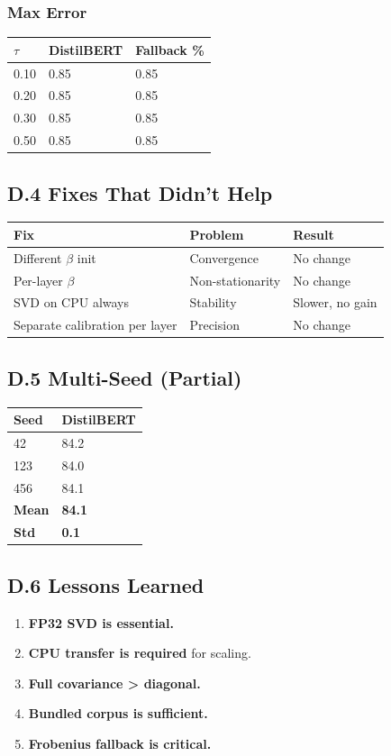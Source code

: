 \subsubsection{Max Error}

\begin{table}[H]
\centering
\small
\begin{tabular}{lll}
\toprule
\textbf{$\tau$} & \textbf{DistilBERT} & \textbf{Fallback \%} \\
\midrule
0.10 & 0.85 & 0.85 \\
0.20 & 0.85 & 0.85 \\
0.30 & 0.85 & 0.85 \\
0.50 & 0.85 & 0.85 \\
\bottomrule
\end{tabular}
\end{table}

\subsection{D.4 Fixes That Didn't Help}

\begin{table}[H]
\centering
\small
\begin{tabular}{lll}
\toprule
\textbf{Fix} & \textbf{Problem} & \textbf{Result} \\
\midrule
Different $\beta$ init & Convergence & No change \\
Per-layer $\beta$ & Non-stationarity & No change \\
SVD on CPU always & Stability & Slower, no gain \\
Separate calibration per layer & Precision & No change \\
\bottomrule
\end{tabular}
\end{table}

\subsection{D.5 Multi-Seed (Partial)}

\begin{table}[H]
\centering
\small
\begin{tabular}{ll}
\toprule
\textbf{Seed} & \textbf{DistilBERT} \\
\midrule
42 & 84.2 \\
123 & 84.0 \\
456 & 84.1 \\
\textbf{Mean} & \textbf{84.1} \\
\textbf{Std} & \textbf{0.1} \\
\bottomrule
\end{tabular}
\end{table}

\subsection{D.6 Lessons Learned}

\begin{enumerate}
\item \textbf{FP32 SVD is essential.}
\item \textbf{CPU transfer is required} for scaling.
\item \textbf{Full covariance > diagonal.}
\item \textbf{Bundled corpus is sufficient.}
\item \textbf{Frobenius fallback is critical.}
\end{enumerate}